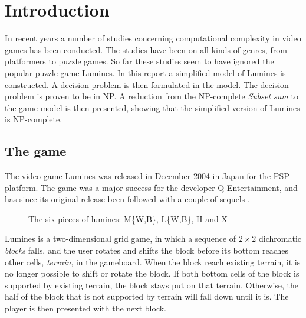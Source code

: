 \section{Introduction}

In recent years a number of studies concerning computational complexity in video games has been conducted. The studies have been on all kinds of genres, from platformers to puzzle games. So far these studies seem to have ignored the popular puzzle game Lumines. In this report a simplified model of Lumines is constructed. A decision problem is then formulated in the model. The decision problem is proven to be in NP. A reduction from the NP-complete \textit{Subset sum} to the game model is then presented, showing that the simplified version of Lumines is NP-complete. 

\subsection{The game}
The video game Lumines was released in December 2004 in Japan for the PSP platform. The game was a major success for the developer Q Entertainment, and has since its original release been followed with a couple of sequels \cite{wiki:lumines}.
\begin{figure}[H]
    \centering
    \caption{The six pieces of lumines: M\{W,B\}, L\{W,B\}, H and X}
    \label{fig:pieces}
\end{figure}

Lumines is a two-dimensional grid game, in which a sequence of $2 \times 2$ dichromatic \textit{blocks} falls, and the user rotates and shifts the block before its bottom  reaches other cells, \textit{terrain}, in the gameboard. When the block reach existing terrain, it is no longer possible to shift or rotate the block. If both bottom cells of the block is supported by existing terrain, the block stays put on that terrain. Otherwise, the half of the block that is not supported by terrain will fall down until it is. The player is then presented with the next block.

